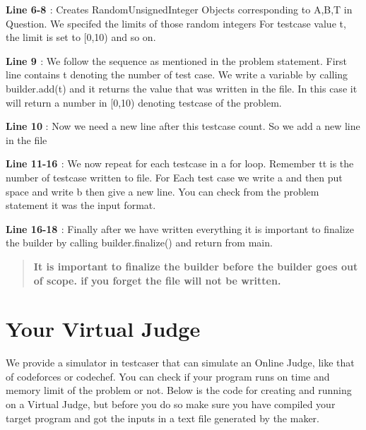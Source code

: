 {\bfseries{Line 6-\/8 }} \+: Creates Random\+Unsigned\+Integer Objects corresponding to A,B,T in Question. We specifed the limits of those random integers For testcase value t, the limit is set to \mbox{[}0,10) and so on.

{\bfseries{Line 9 }} \+: We follow the sequence as mentioned in the problem statement. First line contains t denoting the number of test case. We write a variable by calling {\ttfamily builder.\+add(t)} and it returns the value that was written in the file. In this case it will return a number in \mbox{[}0,10) denoting testcase of the problem.

{\bfseries{Line 10}} \+: Now we need a new line after this testcase count. So we add a new line in the file

{\bfseries{Line 11-\/16 }} \+: We now repeat for each testcase in a for loop. Remember {\ttfamily tt} is the number of testcase written to file. For Each test case we write \textquotesingle{}a\textquotesingle{} and then put space and write \textquotesingle{}b\textquotesingle{} then give a new line. You can check from the problem statement it was the input format.

{\bfseries{Line 16-\/18 }} \+: Finally after we have written everything it is important to finalize the builder by calling {\ttfamily builder.\+finalize()} and return from main.

\begin{quote}
{\bfseries{It is important to finalize the builder before the builder goes out of scope. if you forget the file will not be written. }} \end{quote}


\DoxyHorRuler
\hypertarget{index_virtual_judge}{}\section{Your Virtual Judge}\label{index_virtual_judge}
We provide a simulator in testcaser that can simulate an Online Judge, like that of codeforces or codechef. You can check if your program runs on time and memory limit of the problem or not. Below is the code for creating and running on a Virtual Judge, but before you do so make sure you have compiled your target program and got the inputs in a text file generated by the maker.


